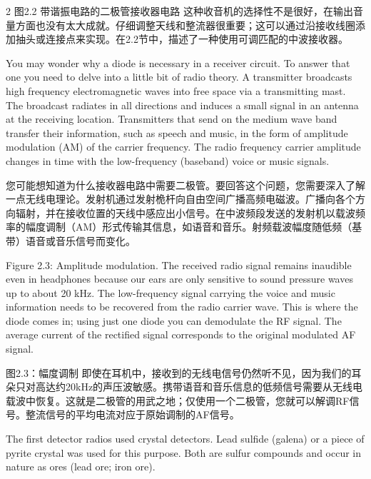 \documentclass{ctexbook}
\begin{document}
\begin{paracol}{2}
图2.2 带谐振电路的二极管接收器电路
这种收音机的选择性不是很好，在输出音量方面也没有太大成就。仔细调整天线和整流器很重要；这可以通过沿接收线圈添加抽头或连接点来实现。在2.2节中，描述了一种使用可调匹配的中波接收器。

\switchcolumn*

You may wonder why a diode is necessary in a receiver circuit. To answer that one you 
need to delve into a little bit of radio theory. A transmitter broadcasts high frequency electromagnetic waves into free space via a transmitting mast. The broadcast radiates in all 
directions and induces a small signal in an antenna at the receiving location. Transmitters 
that send on the medium wave band transfer their information, such as speech and music, 
in the form of amplitude modulation (AM) of the carrier frequency. The radio frequency carrier amplitude changes in time with the low-frequency (baseband) voice or music signals. 

\switchcolumn

您可能想知道为什么接收器电路中需要二极管。要回答这个问题，您需要深入了解一点无线电理论。发射机通过发射桅杆向自由空间广播高频电磁波。广播向各个方向辐射，并在接收位置的天线中感应出小信号。在中波频段发送的发射机以载波频率的幅度调制（AM）形式传输其信息，如语音和音乐。射频载波幅度随低频（基带）语音或音乐信号而变化。

\switchcolumn*

Figure 2.3: Amplitude modulation. 
The received radio signal remains inaudible even in headphones because our ears are only 
sensitive to sound pressure waves up to about 20 kHz. The low-frequency signal carrying 
the voice and music information needs to be recovered from the radio carrier wave. This 
is where the diode comes in; using just one diode you can demodulate the RF signal. The 
average current of the rectified signal corresponds to the original modulated AF signal.

\switchcolumn

图2.3：幅度调制
即使在耳机中，接收到的无线电信号仍然听不见，因为我们的耳朵只对高达约20kHz的声压波敏感。携带语音和音乐信息的低频信号需要从无线电载波中恢复。这就是二极管的用武之地；仅使用一个二极管，您就可以解调RF信号。整流信号的平均电流对应于原始调制的AF信号。

\switchcolumn*

The first detector radios used crystal detectors. Lead sulfide (galena) or a piece of pyrite 
crystal was used for this purpose. Both are sulfur compounds and occur in nature as ores 
(lead ore; iron ore). 


\end{paracol}
\end{document}
